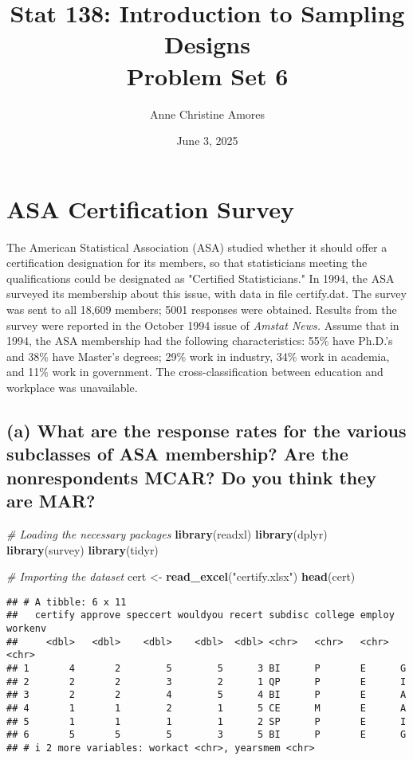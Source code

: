 \documentclass[]{article}
\author{}
\date{\vspace{-2.5em}}
\title{Stat 138: Introduction to Sampling Designs \\ Problem Set 6}
\author{Anne Christine Amores}
\date{June 3, 2025}
\newenvironment{Shaded}{\begin{snugshade}}{\end{snugshade}}
\newcommand{\CommentTok}[1]{\textcolor[rgb]{0.56,0.35,0.01}{\textit{#1}}}
\newcommand{\FunctionTok}[1]{\textcolor[rgb]{0.13,0.29,0.53}{\textbf{#1}}}
\newcommand{\NormalTok}[1]{#1}
\newcommand{\OtherTok}[1]{\textcolor[rgb]{0.56,0.35,0.01}{#1}}
\newcommand{\StringTok}[1]{\textcolor[rgb]{0.31,0.60,0.02}{#1}}
\begin{document}
\maketitle

\section{ASA Certification Survey}
The American Statistical Association (ASA) studied whether it should offer a certification designation for its members, so that statisticians meeting the qualifications could be designated as "Certified Statisticians." In 1994, the ASA surveyed its membership about this issue, with data in file certify.dat. The survey was sent to all 18,609 members; 5001 responses were obtained. Results from the survey were reported in the October 1994 issue of \textit{Amstat News.} Assume that in 1994, the ASA membership had the following characteristics: 55\% have Ph.D.'s and 38\% have Master's degrees; 29\% work in industry, 34\% work in academia, and 11\% work in government. The cross-classification between education and workplace was unavailable. 

\subsection{(a) What are the response rates for the various subclasses of ASA membership? Are the nonrespondents MCAR? Do you think they are MAR?}

\begin{Shaded}
\begin{Highlighting}[]
\CommentTok{\# Loading the necessary packages }
\FunctionTok{library}\NormalTok{(readxl)}
\FunctionTok{library}\NormalTok{(dplyr)}
\FunctionTok{library}\NormalTok{(survey)}
\FunctionTok{library}\NormalTok{(tidyr)}
\end{Highlighting}
\end{Shaded}
\begin{Shaded}
\begin{Highlighting}[]
\CommentTok{\# Importing the dataset }
\NormalTok{cert }\OtherTok{\textless{}{-}} \FunctionTok{read\_excel}\NormalTok{(}\StringTok{"certify.xlsx"}\NormalTok{)}
\FunctionTok{head}\NormalTok{(cert)}
\end{Highlighting}
\end{Shaded}

\begin{verbatim}
## # A tibble: 6 x 11
##   certify approve speccert wouldyou recert subdisc college employ workenv
##     <dbl>   <dbl>    <dbl>    <dbl>  <dbl> <chr>   <chr>   <chr>  <chr>  
## 1       4       2        5        5      3 BI      P       E      G      
## 2       2       2        3        2      1 QP      P       E      I      
## 3       2       2        4        5      4 BI      P       E      A      
## 4       1       1        2        1      5 CE      M       E      A      
## 5       1       1        1        1      2 SP      P       E      I      
## 6       5       5        5        3      5 BI      P       E      G      
## # i 2 more variables: workact <chr>, yearsmem <chr>
\end{verbatim}
\end{document}
